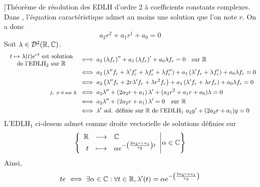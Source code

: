 \documentclass{article}
\begin{document}
\begin{question_kholle}
{  }]{Théorème de résolution des EDLH d'ordre 2 à coefficients constants complexes.}
  Dans \C, l’équation caractéristique admet au moins une solution que l’on note $r$. On a donc
  \[
    a_{2}r^{2} + a_{1}r^{1}+a_{0}=0
  \]
  Soit $\lambda\in\mathcal{D}^{2}(\mathbb R, \mathbb C)$.
  \begin{align}
    \parbox{12em}{\centering$t\mapsto \lambda(t) e^{rt}$ est solution                                                                                                                                                                                            \\ de l’$\mathrm{EDLH_{2}}$ sur \R} & \iff a_{2} \left(\lambda f_{r}\right)'' + a_{1} \left(\lambda f_{r}\right)' + a_{0} \lambda f_{r} = 0 \quad\text{sur } \R \nonumber \\
                                            & \iff a_{2} \left(\lambda'' f_{r} + \lambda' f_{r}' + \lambda f_{r}' + \lambda f_{r}''\right) + a_{1} \left(\lambda' f_{r} + \lambda f_{r}'\right) + a_{0} \lambda f_{r} = 0                              \nonumber \\
                                            & \iff a_{2} \left(\lambda'' f_{r} + 2r \lambda' f_{r} + \lambda r^{2} f_{r}\right) + a_{1} \left(\lambda' f_{r} + \lambda r f_{r}\right)+ a_{0} \lambda f_{r} = 0                                     \nonumber     \\
    \text{\scriptsize $f_{r}\neq 0$ sur \R} & \iff a_{2} \lambda'' + \left(2a_{2}r + a_{1}\right)\lambda' + (a_{2}r^{2} + a_{1}r + a_{0})\lambda = 0                                                                                  \nonumber                  \\
                                            & \iff a_{2} \lambda'' + \left(2a_{2}r +a_{1}\right)\lambda' = 0 \quad\text{sur } \R                                                                                          \nonumber                              \\
                                            & \iff \lambda' \text{ sol. définie sur \R de l'$\mathrm{EDLH_{1}}$ } a_{2}y' + (2a_{2}r + a_{1})y=0 \label{s7:q2:1}
  \end{align}
  L'$\mathrm{EDLH_{1}}$ ci-dessus admet comme droite vectorielle de solutions définies sur \R
  \[
    \left\{\begin{array}{rcl} \mathbb R & \longrightarrow & \mathbb C \\ t & \longmapsto & \alpha e^{-\left(\frac{2a_{2}r+a_{1}}{a_{2}}\right)t} \end{array} \middle | \alpha\in\mathbb C\right\}
  \]
  Ainsi,
  \begin{align*}
    te & \iff \exists \alpha\in\C: \forall t\in\R, \lambda'(t)=\alpha e^{-\left(\frac{2a_{2}r + a_{1}}{a_{2}}\right)}                                                                                                                                                 \\

\end{align*}
\end{question_kholle}
\end{document}
